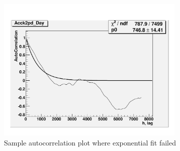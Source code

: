 \begin{figure}
\centering
\includegraphics[width=0.8\textwidth]{Figures/MCMC/autoCorrBad}
\caption{Sample autocorrelation plot where exponential fit failed
\label{BadAutoCorr}}
\end{figure}

